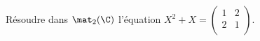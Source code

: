 \begin{enonce}
\begin{exercise}[ID={RMS 125 E827, 2014 Centrale PSI},subtitle={2014 Centrale PSI},tags={}]
  Résoudre dans $\mat_2(\C)$ l'équation $X^2+X= \begin{pmatrix} 1 & 2 \\ 2 & 1 \\ \end{pmatrix}$.
\end{exercise}
\begin{solution}
\end{solution}
\end{enonce}
